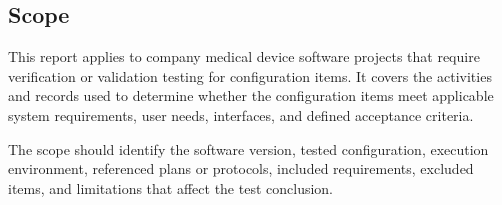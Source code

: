 \subsection{Scope}
This report applies to \Gls{company} medical device software projects that
require verification or validation testing for configuration items.  It covers
the activities and records used to determine whether the configuration items
meet applicable system requirements, user needs, interfaces, and defined
acceptance criteria.

\tlcVspace

The scope should identify the software version, tested configuration, execution
environment, referenced plans or protocols, included requirements, excluded
items, and limitations that affect the test conclusion.
